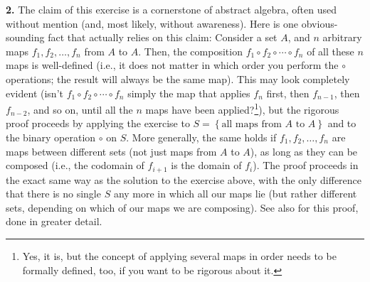 \documentclass[paper=a4, fontsize=12pt]{scrartcl} %
\newcommand{\set}[1]{\left\{ #1 \right\}}
\theoremstyle{plainsl}
\theoremstyle{definition}
\theoremstyle{remark}
\begin{document}
\vspace{1pc}

\textbf{2.}
The claim of this exercise is a cornerstone of abstract
algebra, often used without mention (and, most likely,
without awareness).
Here is one obvious-sounding fact that actually relies on
this claim:
Consider a set $A$, and $n$ arbitrary maps
$f_1, f_2, \ldots, f_n$ from $A$ to $A$.
Then, the composition $f_1 \circ f_2 \circ \cdots \circ f_n$
of all these $n$ maps is well-defined
(i.e., it does not matter in which order you perform the
$\circ$ operations; the result will always be the same map).
This may look completely evident (isn't
$f_1 \circ f_2 \circ \cdots \circ f_n$ simply the map
that applies $f_n$ first, then $f_{n-1}$, then $f_{n-2}$,
and so on, until all the $n$ maps have been
applied?\footnote{Yes, it is, but the concept of
applying several maps in order needs to be formally
defined, too, if you want to be rigorous about it.}),
but the rigorous proof proceeds by applying the exercise
to $S = \set{\text{all maps from $A$ to $A$}}$ and to the
binary operation $\circ$ on $S$.
More generally, the same holds if
$f_1, f_2, \ldots, f_n$ are maps between different sets
(not just maps from $A$ to $A$), as long as they can be
composed (i.e., the codomain of $f_{i+1}$ is the domain
of $f_i$).
The proof proceeds in the exact same way as the solution
to the exercise above, with the only difference that there
is no single $S$ any more in which all our maps lie
(but rather different sets, depending on
which of our maps we are composing).
See also \cite[\S 2.13]{detnotes} for this proof, done
in greater detail.
\end{document}
